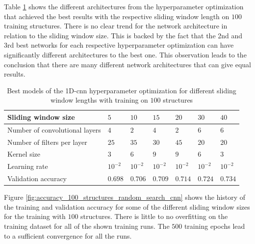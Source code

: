 \documentclass[conference]{IEEEtran}
\begin{document}
Table \ref{tab:hyperparameters_100_structures} shows the different architectures from the hyperparameter optimization that achieved the best results with the respective sliding window length on $ 100 $ training structures. There is no clear trend for the network architecture in relation to the sliding window size. This is backed by the fact that the 2nd and 3rd best networks for each respective hyperparameter optimization can have significantly different architectures to the best one. This observation leads to the conclusion that there are many different network architectures that can give equal results.

\begin{table}[htp]
	\centering
	\caption{Best models of the 1D-\gls{cnn} hyperparameter optimization for different sliding window lengths with training on $ 100 $ structures}
	\label{tab:hyperparameters_100_structures}
	\setlength{\tabcolsep}{3pt} %
	\begin{tabular}{p{2.5cm}|llllll}
		Sliding window size & $ 5 $ & $ 10 $ & $ 15 $ & $ 20 $ & $ 30 $ & $ 40 $ \\
		\hline
		Number of convolutional layers & $ 4 $ & $ 2 $ & $ 4 $ & $ 2 $ & $ 6 $ & $ 6 $ \\
		Number of filters per layer & $ 25 $ & $ 35 $ & $ 30 $ & $ 45 $ & $ 20 $ & $ 20 $ \\
		Kernel size & $ 3 $ & $ 6 $ & $ 9 $ & $ 9 $ & $ 6 $ & $ 3 $ \\
		Learning rate & $ 10^{-2} $ & $ 10^{-2} $ & $ 10^{-2} $ & $ 10^{-2} $ & $ 10^{-2} $ & $ 10^{-2} $ \\
		\hline
		Validation accuracy & $ 0.698 $ & $ 0.706 $ & $ 0.709 $ & $ 0.714 $ & $ 0.724 $ & $ 0.734 $
	\end{tabular}
\end{table}

Figure \ref{fig:accuracy_100_structures_random_search_cnn} shows the history of the training and validation accuracy for some of the different sliding window sizes for the training with $ 100 $ structures. There is little to no overfitting on the training dataset for all of the shown training runs. The $ 500 $ training epochs lead to a sufficient convergence for all the runs.
\end{document}
